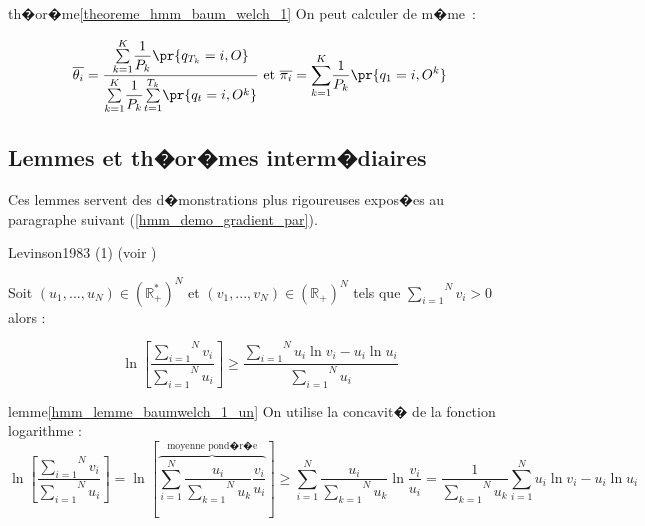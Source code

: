 \begin{xdemo}{th�or�me}{\ref{theoreme_hmm_baum_welch_1}}
On peut calculer de m�me~:

        $$
        \overline{\theta_{i}}=\dfrac{\underset {k=1}{\overset{K}{\sum}}\dfrac{1}{P_{k}} \pr{  q_{T_{k}}=i,O}
        }{\underset{k=1}{\overset{K}{\sum}}\dfrac{1}{P_{k}}\underset{t=1}
         {\overset{T_{k}}{\sum}} \pr{  q_{t}=i,O^{k}}  } \text{ et }\overline{\pi
        _{i}}=\underset{k=1}{\overset{K}{ {\displaystyle\sum} }}\dfrac{1}{P_{k}} \pr{  q_{1}=i,O^{k}}
        $$

\end{xdemo}












\subsection{Lemmes et th�or�mes interm�diaires}

Ces lemmes servent des d�monstrations plus rigoureuses expos�es au paragraphe suivant (\ref{hmm_demo_gradient_par}).


            \begin{xlemma}{Levinson1983 (1)}\label{hmm_lemme_baumwelch_1_un} (voir )
            
            Soit $\left(  u_{1},...,u_{N}\right)  \in\left( \mathbb{R}_{+}^{\ast}\right)  ^{N}$ et
             $\left(  v_{1},...,v_{N}\right) \in\left( \mathbb{R}_{+}\right) ^{N}$ tels que $\overset{N}{\underset {i=1}{\sum}}v_{i}>0$ alors :
            
                    $$
                    \ln\left[  \frac{\overset{N}{\underset{i=1}{\sum}}v_{i}}{\overset{N}{\underset{i=1}{\sum}}
                                u_{i}}\right]  \geqslant\dfrac{\overset
                    {N}{\underset{i=1}{\sum}}u_{i}\ln v_{i}-u_{i}\ln u_{i}}{\overset{N} {\underset{i=1}{\sum}}u_{i}}
                    $$
                    
            \end{xlemma}

\begin{xdemo}{lemme}{\ref{hmm_lemme_baumwelch_1_un}}
On utilise la concavit� de la fonction logarithme :
        $$
        \ln\left[  \frac{\overset{N}{\underset{i=1}{\sum}}v_{i}}{\overset
        {N}{\underset{i=1}{\sum}}u_{i}}\right]  =\ln\left[  \overset{\text{moyenne
        pond�r�e}}{\overbrace{\overset{N}{\underset{i=1}{\sum}}\frac{u_{i}%
        }{\overset{N}{\underset{k=1}{\sum}}u_{k}}\dfrac{v_{i}}{u_{i}}}}\right]
        \geqslant\overset{N}{\underset{i=1}{\sum}}\frac{u_{i}}{\overset{N}%
        {\underset{k=1}{\sum}}u_{k}}\ln\dfrac{v_{i}}{u_{i}}=\frac{1}{\overset
         {N}{\underset{k=1}{\sum}}u_{k}}\overset{N}{\underset{i=1}{\sum}}u_{i}\ln
        v_{i}-u_{i}\ln u_{i}
        $$
\end{xdemo}









